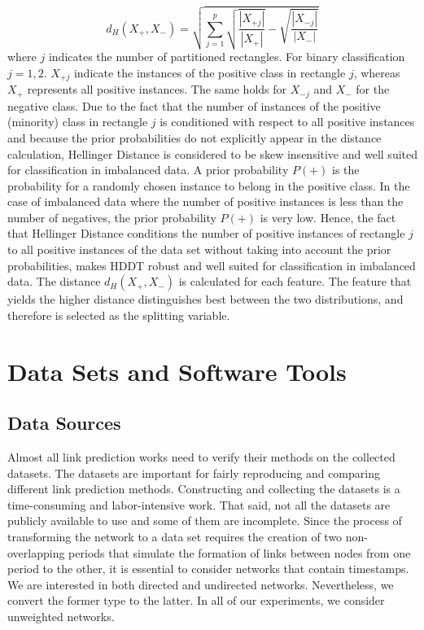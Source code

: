 \documentclass{acm_proc_article-sp}
\begin{document}
\begin{equation*}
	d_H(X{_+},X{_-}) = \sqrt{\sum_{j = 1}^{p} \sqrt{\frac{|X{_{+j}}|}{|X{{_+}}|}} - 							\sqrt{\frac{|X{_{-j}}|}	{|X{{_-}}|}}}
\end{equation*}
where $j$ indicates the number of partitioned rectangles. For binary classification $j = 1,2$. $X_{+j}$ indicate the instances of the positive class in rectangle $j$, whereas $X_{+}$ represents all positive instances. The same holds for $X_{-j}$ and $X_{-}$ for the negative class. Due to the fact that the number of instances of the positive (minority) class in rectangle $j$ is conditioned with respect to all positive instances and because the prior probabilities do not explicitly appear in the distance calculation, Hellinger Distance is considered to be skew insensitive and well suited for classification in imbalanced data. A prior probability $P(+)$ is the probability for a randomly chosen instance to belong in the positive class. In the case of imbalanced data where the number of positive instances is less than the number of negatives, the prior probability $P(+)$ is very low. Hence, the fact that Hellinger Distance conditions the number of positive instances of rectangle $j$ to all positive instances of the data set without taking into account the prior probabilities, makes HDDT robust and well suited for classification in imbalanced data. The distance $d_H(X_{+},X_{-})$ is calculated for each feature. The feature that yields the higher distance distinguishes best between the two distributions, and therefore is selected as the splitting variable. 
 
\section{Data Sets and Software Tools}
\label{Sect.5}
\subsection{Data Sources}
Almost all link prediction works need to verify their methods on the collected datasets. The datasets are important for fairly reproducing and comparing different link prediction methods. Constructing and collecting the datasets is a time-consuming and labor-intensive work. That said, not all the datasets are publicly available to use and some of them are incomplete. Since the process of transforming the network to a data set requires the creation of two non-overlapping periods that simulate the formation of links between nodes from one period to the other, it is essential to consider networks that contain timestamps. We are interested in both directed and undirected networks. Nevertheless, we convert the former type to the latter. In all of our experiments, we consider unweighted networks.
\end{document}

